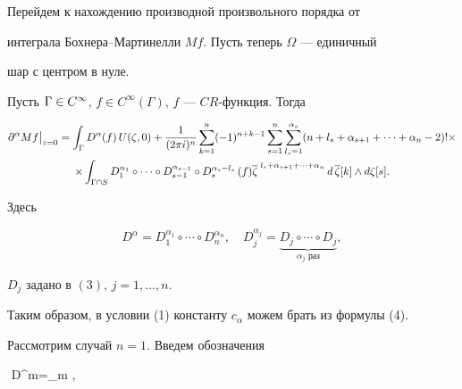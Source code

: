 Перейдем к нахождению производной произвольного порядка от


интеграла Бохнера--Мар\-ти\-нел\-ли $Mf$. Пусть теперь $\Omega$ --- единичный


шар с центром в нуле.





\begin{thm}


Пусть $\g\in C^\infty$, $f\in C^\infty


(\Gamma)$, $f$ --- $CR$-функция. Тогда


\begin{multline}


\partial^\alpha Mf\big|_{z=0}=\int_\Gamma D^\alpha(f)\,


U(\zeta,0)+\frac{1}{(2\pi i)^n}\sum_{k=1}^n(-1)^{n+k-1}


\sum_{s=1}^n\sum_{l_s=1}^{\alpha_s}


(n+l_s+\alpha_{s+1}+\dotsb+\alpha_n-2)!\times\\


%


\times\int_{\Gamma\cap S}D_1^{\alpha_1}\circ\dotsb\circ


D^{\alpha_{s-1}}_{s-1}\circ D^{\alpha_s-l_s}_s\,(f)


\ovl\zeta^{\;l_s+\alpha_{s+1}+\dotsb+\alpha_n}\,d\,\ovl\zeta[k]\land


d\zeta[s].


\end{multline}


Здесь


$$


D^\alpha=D_1^{\alpha_1}\circ\dotsb\circ D^{\alpha_n}_n,\quad


D_j^{\alpha_j}=


\underbrace{D_j\circ\dotsb\circ D_j}_{\alpha_j \text{  раз}},


$$


$D_j$ задано в $(3)$, $j=1,\dotsc,n.$


\end{thm}





Таким образом, в условии (1) константу $c_\alpha$ можем брать из формулы (4).





Рассмотрим случай $n=1$. Введем обозначения


$$  D^m=_{m },\quad


